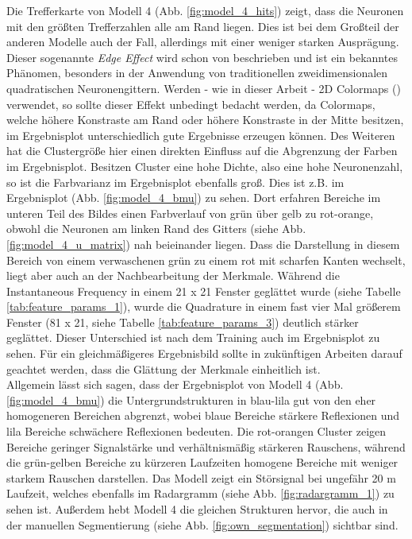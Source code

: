 Die Trefferkarte von Modell 4 (Abb. \ref{fig:model_4_hits}) zeigt, dass die Neuronen mit den größten Trefferzahlen alle am Rand liegen. Dies ist bei dem Großteil der anderen Modelle auch der Fall, allerdings mit einer weniger starken Ausprägung. Dieser sogenannte \textit{Edge Effect} wird schon von \textcite{schmidt_effects_2011} beschrieben und ist ein bekanntes Phänomen, besonders in der Anwendung von traditionellen zweidimensionalen quadratischen Neuronengittern. Werden - wie in dieser Arbeit - 2D Colormaps (\textcite{steiger_explorative_2015}) verwendet, so sollte dieser Effekt unbedingt bedacht werden, da Colormaps, welche höhere Konstraste am Rand oder höhere Konstraste in der Mitte besitzen, im Ergebnisplot unterschiedlich gute Ergebnisse erzeugen können. Des Weiteren hat die Clustergröße hier einen direkten Einfluss auf die Abgrenzung der Farben im Ergebnisplot. Besitzen Cluster eine hohe Dichte, also eine hohe Neuronenzahl, so ist die Farbvarianz im Ergebnisplot ebenfalls groß. Dies ist z.B. im Ergebnisplot (Abb. \ref{fig:model_4_bmu}) zu sehen. Dort erfahren Bereiche im unteren Teil des Bildes einen Farbverlauf von grün über gelb zu rot-orange, obwohl die Neuronen am linken Rand des Gitters (siehe Abb. \ref{fig:model_4_u_matrix}) nah beieinander liegen. Dass die Darstellung in diesem Bereich von einem verwaschenen grün zu einem rot mit scharfen Kanten wechselt, liegt aber auch an der Nachbearbeitung der Merkmale. Während die Instantaneous Frequency in einem 21 x 21 Fenster geglättet wurde (siehe Tabelle \ref{tab:feature_params_1}), wurde die Quadrature in einem fast vier Mal größerem Fenster (81 x 21, siehe Tabelle \ref{tab:feature_params_3}) deutlich stärker geglättet. Dieser Unterschied ist nach dem Training auch im Ergebnisplot zu sehen. Für ein gleichmäßigeres Ergebnisbild sollte in zukünftigen Arbeiten darauf geachtet werden, dass die Glättung der Merkmale einheitlich ist.\\
Allgemein lässt sich sagen, dass der Ergebnisplot von Modell 4 (Abb. \ref{fig:model_4_bmu}) die Untergrundstrukturen in blau-lila gut von den eher homogeneren Bereichen abgrenzt, wobei blaue Bereiche stärkere Reflexionen und lila Bereiche schwächere Reflexionen bedeuten. \noindent Die rot-orangen Cluster zeigen Bereiche geringer Signalstärke und verhältnismäßig stärkeren Rauschens, während die grün-gelben Bereiche zu kürzeren Laufzeiten homogene Bereiche mit weniger starkem Rauschen darstellen. Das Modell zeigt ein Störsignal bei ungefähr 20 m Laufzeit, welches ebenfalls im Radargramm (siehe Abb. \ref{fig:radargramm_1}) zu sehen ist. Außerdem hebt Modell 4 die gleichen Strukturen hervor, die auch in der manuellen Segmentierung (siehe Abb. \ref{fig:own_segmentation}) sichtbar sind.

